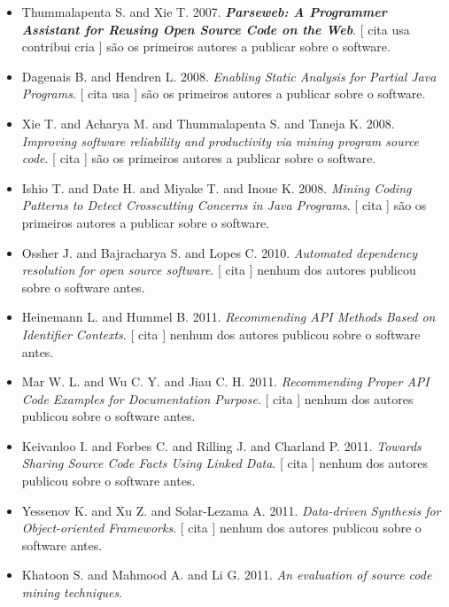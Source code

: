 \begin{itemize}
\item Thummalapenta S. and Xie T.
      2007.
        \textbf{\textit{ Parseweb: A Programmer Assistant for Reusing Open Source Code on the Web}}.
      [
          cita
          usa
          contribui
          cria
      ]
são os primeiros autores a publicar sobre o software.
\item Dagenais B. and Hendren L.
      2008.
        \textit{ Enabling Static Analysis for Partial Java Programs}.
      [
          cita
          usa
      ]
são os primeiros autores a publicar sobre o software.
\item Xie T. and Acharya M. and Thummalapenta S. and Taneja K.
      2008.
        \textit{ Improving software reliability and productivity via mining program source code}.
      [
          cita
      ]
são os primeiros autores a publicar sobre o software.
\item Ishio T. and Date H. and Miyake T. and Inoue K.
      2008.
        \textit{ Mining Coding Patterns to Detect Crosscutting Concerns in Java Programs}.
      [
          cita
      ]
são os primeiros autores a publicar sobre o software.
\item Ossher J. and Bajracharya S. and Lopes C.
      2010.
        \textit{ Automated dependency resolution for open source software}.
      [
          cita
      ]
nenhum dos autores publicou sobre o software antes.
\item Heinemann L. and Hummel B.
      2011.
        \textit{ Recommending API Methods Based on Identifier Contexts}.
      [
          cita
      ]
nenhum dos autores publicou sobre o software antes.
\item Mar W. L. and Wu C. Y. and Jiau C. H.
      2011.
        \textit{ Recommending Proper API Code Examples for Documentation Purpose}.
      [
          cita
      ]
nenhum dos autores publicou sobre o software antes.
\item Keivanloo I. and Forbes C. and Rilling J. and Charland P.
      2011.
        \textit{ Towards Sharing Source Code Facts Using Linked Data}.
      [
          cita
      ]
nenhum dos autores publicou sobre o software antes.
\item Yessenov K. and Xu Z. and Solar-Lezama A.
      2011.
        \textit{ Data-driven Synthesis for Object-oriented Frameworks}.
      [
          cita
      ]
nenhum dos autores publicou sobre o software antes.
\item Khatoon S. and Mahmood A. and Li G.
      2011.
        \textit{ An evaluation of source code mining techniques}.

\end{itemize}
